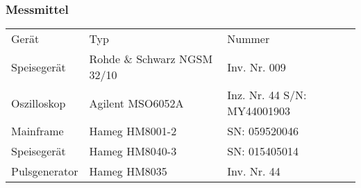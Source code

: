\subsubsection{Messmittel}
    \begin{tabular}{lll}
        \rowcolor{gray} Gerät &
            Typ &
            Nummer \\
        Speisegerät & 
            Rohde \& Schwarz NGSM 32/10 &
            Inv. Nr. 009 \\
        Oszilloskop &
            Agilent MSO6052A &
            Inz. Nr. 44 S/N: MY44001903 \\
        Mainframe &
            Hameg HM8001-2 &
            SN: 059520046 \\
        Speisegerät &
            Hameg HM8040-3 &
            SN: 015405014 \\
        Pulsgenerator &
            Hameg HM8035 &
            Inv. Nr. 44 \\
    \end{tabular}

